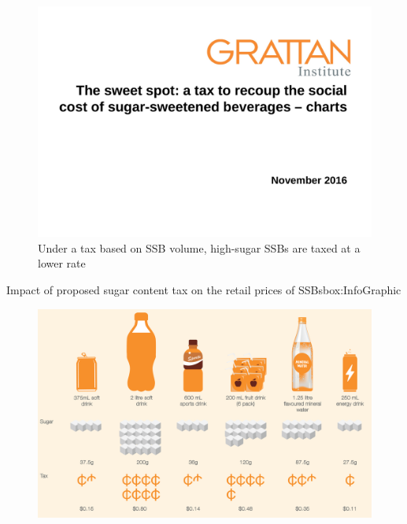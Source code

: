 \documentclass[embargoed]{grattan}
\begin{document}
\begin{figure}
\caption{Under a tax based on SSB volume, high-sugar SSBs are taxed at a lower rate}

\includegraphics[page=12]{atlas/ObesityCharts}


\end{figure}

\begin{bigbox*}{Impact of proposed sugar content tax on the retail prices of SSBs}{box:InfoGraphic}
\begin{figure}[H]

\hspace{2.5cm}\includegraphics[width=.8\textwidth]{atlas/InfoGraphicSnip}

\end{figure}
\end{bigbox*}
\end{document}
